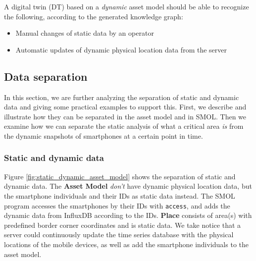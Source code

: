 \documentclass{article}
\begin{document}
A digital twin (DT) based on a \emph{dynamic} asset model should be able to recognize the following, according to the generated knowledge graph:
\begin{itemize}
    \item Manual changes of static data by an operator
    \item Automatic updates of dynamic physical location data from the server
\end{itemize}
\subsection{Data separation}
In this section, we are further analyzing the separation of static and dynamic data and giving some practical examples to support this. First, we describe and illustrate how they can be separated in the asset model and in SMOL. Then we examine how we can separate the static analysis of what a critical area \emph{is} from the dynamic snapshots of smartphones at a certain point in time.

\subsubsection{Static and dynamic data}\label{subsubsec:StaticAndDynamicData}
Figure \ref{fig:static_dynamic_asset_model} shows the separation of static and dynamic data. The \textbf{Asset Model} \emph{don't} have dynamic physical location data, but the smartphone individuals and their IDs as static data instead. The SMOL program accesses the smartphones by their IDs with \verb|access|, and adds the dynamic data from InfluxDB according to the IDs. \textbf{Place} consists of area(s) with predefined border corner coordinates and is static data. We take notice that a server could continuously update the time series database with the physical locations of the mobile devices, as well as add the smartphone individuals to the asset model.
\end{document}
